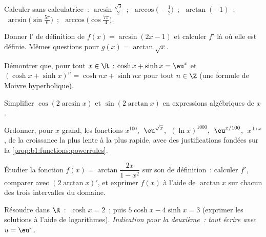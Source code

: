 \begin{exercise}[$\star$]\label{exo:b1:functions:1}
Calculer sans calculatrice~: $\arcsin\frac{\sqrt 3}{2}$~;
$\;\arccos\bigl(-\frac 12\bigr)$~; $\;\arctan(-1)$~;
$\;\arcsin\bigl(\sin\frac{5\pi}{6}\bigr)$~;
$\;\arccos\bigl(\cos\frac{7\pi}{4}\bigr)$.
\end{exercise}

\begin{exercise}[$\star$]\label{exo:b1:functions:2}
Donner l' de définition de $f(x) = \arcsin(2x - 1)$ et
calculer $f'$ là où elle est définie. Mêmes questions pour
$g(x) = \arctan\sqrt{x}$.
\end{exercise}

\begin{exercise}[$\star$]\label{exo:b1:functions:3}
Démontrer que, pour tout $x \in \R$~: $\cosh x + \sinh x = \eu^x$ et
$(\cosh x + \sinh x)^n = \cosh nx + \sinh nx$ pour tout $n \in \Z$
(une formule de Moivre hyperbolique).
\end{exercise}

\begin{exercise}[$\star$]\label{exo:b1:functions:4}
Simplifier $\cos(2\arcsin x)$ et $\sin(2\arctan x)$ en expressions
algébriques de $x$.
\end{exercise}

\begin{exercise}[$\star$]\label{exo:b1:functions:5}
Ordonner, pour $x$ grand, les fonctions
$x^{100}$, $\;\eu^{\sqrt x}$, $\;(\ln x)^{1000}$, $\;\eu^{x/100}$,
$\;x^{\ln x}$, de la croissance la plus lente à la plus rapide, avec
des justifications fondées sur la \cref{prop:b1:functions:powerrules}.
\end{exercise}

\begin{exercise}[$\star\star$]\label{exo:b1:functions:6}
Étudier la fonction $f(x) = \arctan\dfrac{2x}{1 - x^2}$ sur son
 de définition~: calculer $f'$, comparer avec
$(2\arctan x)'$, et exprimer $f(x)$ à l'aide de $\arctan x$ sur chacun
des trois intervalles du domaine.
\end{exercise}

\begin{exercise}[$\star\star$]\label{exo:b1:functions:7}
Résoudre dans $\R$~: $\;\cosh x = 2$~; puis $5\cosh x - 4 \sinh x = 3$
(exprimer les solutions à l'aide de logarithmes). \emph{Indication
pour la deuxième~: tout écrire avec $u = \eu^x$.}
\end{exercise}

